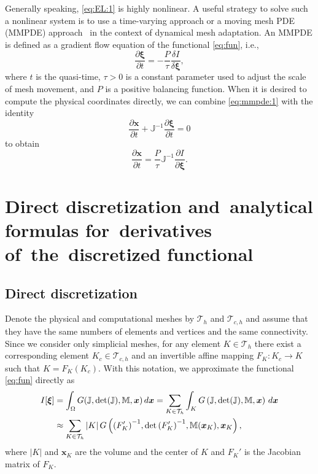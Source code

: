 \documentclass[american]{scrartcl}
\providecommand{\Abs}[1]{\left\lvert#1\right\rvert}
\providecommand{\V}[1]{\boldsymbol{#1}}
\providecommand{\dx}{\,d\V{x}}
\providecommand{\p}[2]{\frac{\partial{}#1}{\partial{}#2}}
\providecommand{\Th}{\mathcal{T}_h}
\providecommand{\Thc}{\mathcal{T}_{c,h}}
\providecommand{\M}{\mathbb{M}}
\providecommand{\J}{\mathbb{J}}
\theoremstyle{remark}
\begin{document}
Generally speaking, \cref{eq:EL:1} is highly nonlinear.
A useful strategy to solve such a nonlinear system is to use a time-varying approach or a moving mesh PDE (MMPDE) approach~\cite{HRR94b,HRR94a} in the context of dynamical mesh adaptation. 
An MMPDE is defined as a gradient flow equation of the functional \cref{eq:fun}, i.e.,
\begin{equation}
   \p{\V{\xi}}{t} 
      = - \frac{P}{\tau} \frac{\delta I}{\delta \V{\xi}}
   ,
   \label{eq:mmpde:1}
\end{equation}
where $t$ is the quasi-time, $\tau > 0$ is a constant parameter used to adjust the scale of mesh movement, and $P$ is a positive balancing function.
When it is desired to compute the physical coordinates directly, we can combine \cref{eq:mmpde:1} with the identity
\[
   \p{\V{x}}{t} + \J^{-1} \p{\V{\xi}}{t} = 0 
\]
to obtain
\begin{equation*}
   \p{\V{x}}{t} = \frac{P}{\tau} \J^{-1} \p{I}{\V{\xi}}
   .
   
\end{equation*}

\section{Direct discretization and~analytical formulas for~derivatives of~the~discretized functional}
\label{sect:formula}

\subsection{Direct discretization}

Denote the physical and computational meshes by $\Th$ and $\Thc$ and assume that they have the same numbers of elements and vertices and the same connectivity.
Since we consider only simplicial meshes, for any element $K\in\Th$ there exist a corresponding element $K_c\in\Thc$ and an invertible affine mapping $F_K\colon K_c \to K$ such that $K = F_K(K_c)$.
With this notation, we approximate the functional \cref{eq:fun} directly as
\begin{align}
   I[\V{\xi}] 
     &= \int_\Omega G(\J, \det(\J), \M, \V{x}) \dx
      = \sum\limits_{K \in \Th} \int_K G \left(\J, \det(\J), \M, \V{x}\right) \dx
   \notag\\ 
   &\approx \sum\limits_{K \in \Th} 
      \Abs{K} G \left( {(F_K')}^{-1}, \det{(F_K')}^{-1}, \M(\V{x}_K), \V{x}_K \right) ,
   \label{eq:dis:fun:1}
\end{align}
where $\Abs{K}$ and $\V{x}_K$ are the volume and the center of $K$ and $F_K'$ is the Jacobian matrix of $F_K$.
\end{document}
